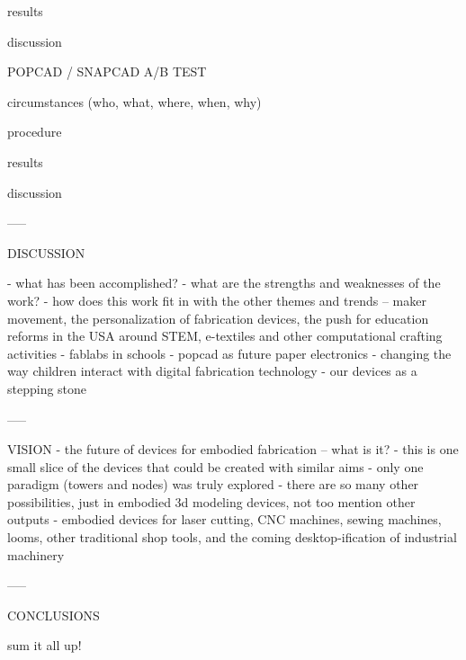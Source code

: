 results

discussion 



POPCAD / SNAPCAD A/B TEST

circumstances (who, what, where, when, why)

procedure

results

discussion 


-----

DISCUSSION 

- what has been accomplished? 
- what are the strengths and weaknesses of the work?
- how does this work fit in with the other themes and trends -- maker movement,
the personalization of fabrication devices, the push for education reforms in
the USA around STEM, e-textiles and other computational crafting activities
- fablabs in schools
- popcad as future paper electronics
- changing the way children interact with digital fabrication technology - our
devices as a stepping stone

-----

VISION
- the future of devices for embodied fabrication -- what is it?
- this is one small slice of the devices that could be created with similar
 aims
- only one paradigm (towers and nodes) was truly explored - there are so many
other possibilities, just in embodied 3d modeling devices, not too mention other
outputs - embodied devices for laser cutting, CNC machines, sewing machines,
looms, other traditional shop tools, and the coming desktop-ification of
industrial machinery


-----

CONCLUSIONS 

sum it all up!







